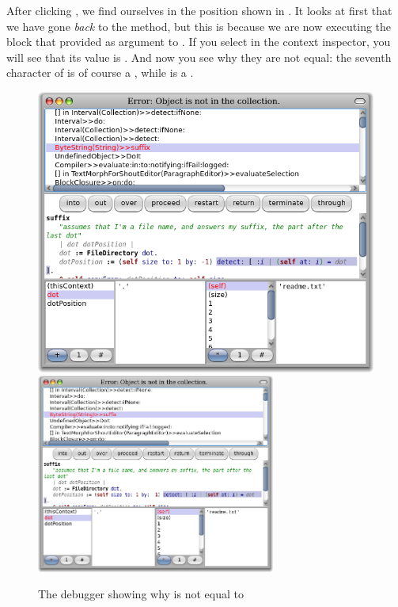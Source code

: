 \documentclass[a4paper,10pt,twoside]{book}
\begin{document}
After clicking , we find ourselves in the position shown in .
It looks at first that we have gone \emph{back} to the  method, but this is because we are now executing the block that  provided as argument to .
If you select  in the context inspector, you will see that its value is .
And now you see why they are not equal: the seventh character of  is of course a , while  is a .

\begin{figure}[btp]
	\begin{center}
	\ifluluelse
		{\includegraphics[width=\textwidth]{dotIsAString}}
		{\includegraphics[width=0.7\textwidth]{dotIsAString}}
	\end{center}
	\caption{The debugger showing why  is not equal to }
\end{figure}
\end{document}
